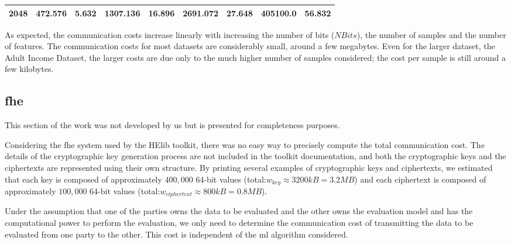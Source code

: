 \begin{table}[H]
\begin{tabular}{|c|l|l|l|l|l|l|l|l|}
2048                   & 472.576                                                                          & 5.632                                                                        & 1307.136                                                                         & 16.896                                                                       & 2691.072                                                                         & 27.648                                                                       & 405100.0                                                                         & 56.832                                                                       \\ \hline
\end{tabular}
\end{table}


As expected, the communication costs increase linearly with increasing the number of bits ($NBits$), the number of samples and the number of features. The communication costs for most datasets are considerably small, around a few megabytes. Even for the larger dataset, the Adult Income Dataset, the larger costs are due only to the much higher number of samples considered; the cost per sample is still around a few kilobytes.



\subsection{\acl{fhe}}

This section of the work was not developed by us but is presented for completeness purposes.

Considering the \ac{fhe} system used by the HElib toolkit, there was no easy way to precisely compute the total communication cost. The details of the cryptographic key generation process are not included in the toolkit documentation, and both the cryptographic keys and the ciphertexts are represented using their own structure. By printing several examples of cryptographic keys and ciphertexts, we estimated that each key is composed of approximately $400,000$ 64-bit values (total:$w_{key}\approx 3200kB=3.2MB$) and each ciphertext is composed of approximately $100,000$ 64-bit values (total:$w_{ciphertext}\approx 800kB=0.8MB$).

Under the assumption that one of the parties owns the data to be evaluated and the other owns the evaluation model and has the computational power to perform the evaluation, we only need to determine the communication cost of transmitting the data to be evaluated from one party to the other. This cost is independent of the \ac{ml} algorithm considered.

